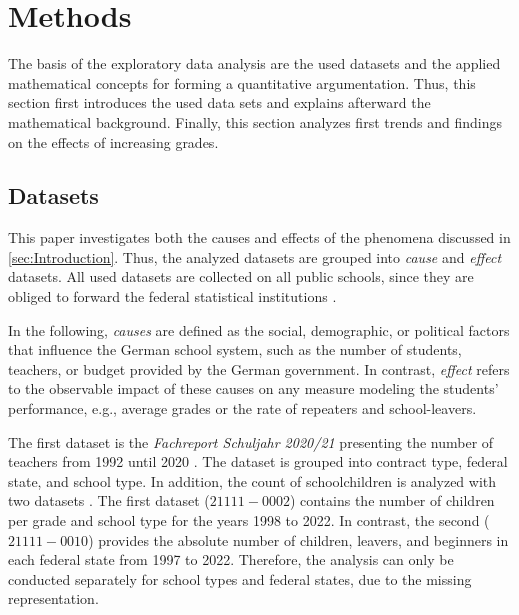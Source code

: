 \section{Methods}
The basis of the exploratory data analysis are the used datasets and the applied mathematical concepts for forming a quantitative argumentation. Thus, this section first introduces the used data sets and explains afterward the mathematical background. Finally, this section analyzes first trends and findings on the effects of increasing grades.

\subsection{Datasets}
This paper investigates both the causes and effects of the phenomena discussed in \autoref{sec:Introduction}. Thus, the analyzed datasets are grouped into \emph{cause} and \emph{effect} datasets. All used datasets are collected on all public schools, since they are obliged to forward the federal statistical institutions \cite{statistische_bundesamt_statistisches_2024,kultusminister_konferenz_abiturnoten_nodate}.

In the following, \emph{causes} are defined as the social, demographic, or political factors that  influence the German school system, such as the number of students, teachers, or budget provided by the German government. In contrast, \emph{effect} refers to the observable impact of these causes on any measure modeling the students' performance, e.g., average grades or the rate of repeaters and school-leavers.

The first dataset is the \textit{Fachreport Schuljahr 2020/21} presenting the number of teachers from 1992 until 2020 \cite{statistische_bundesamt_allgemeinbildende_2022}. The dataset is grouped into contract type, federal state, and school type. In addition, the count of schoolchildren is analyzed with two datasets \cite{statistische_bundesamt_statistisches_2024}. The first dataset (\href{https://www-genesis.destatis.de/genesis//online?operation=table&code=21111-0002&bypass=true&levelindex=0&levelid=1706352545984#abreadcrumb}{$21111-0002$}) contains the number of children per grade and school type  for the years 1998 to 2022. In contrast, the second (\href{https://www-genesis.destatis.de/genesis//online?operation=table&code=21111-0010&bypass=true&levelindex=0&levelid=1706352536762#abreadcrumb}{$21111-0010$}) provides the absolute number of children, leavers, and beginners in each federal state from 1997 to 2022. Therefore, the analysis can only be conducted separately for school types and federal states, due to the missing representation.

